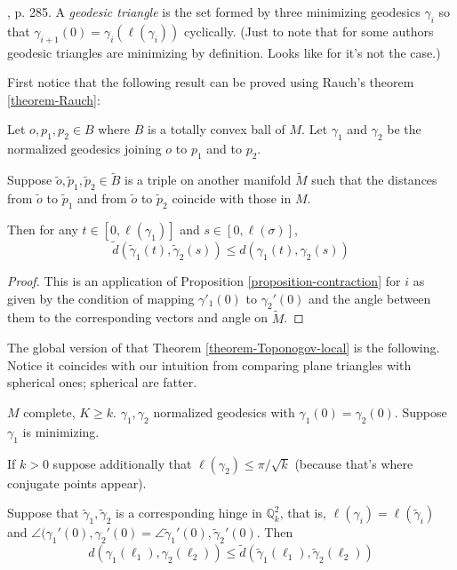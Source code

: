 \begin{definition}
\label{definition-geodesic-triangle}
\cite{doc}, p. 285. A {\it geodesic triangle} is the set formed by three
minimizing geodesics $\gamma_i$ so that
$\gamma_{i+1}(0)=\gamma_i(\ell(\gamma_i))$ cyclically. (Just to note that for
some authors geodesic triangles are minimizing by definition. Looks like for
\cite{meyers} it's not the case.)
\end{definition}

First notice that the following result can be proved using Rauch's theorem
\ref{theorem-Rauch}:

\begin{theorem}
\label{theorem-Toponogov-local}
Let $o,p_1,p_2 \in B$ where $B$ is a totally convex ball of $M$. Let $\gamma_1$
and $\gamma_2$ be the normalized geodesics joining $o$ to $p_1$ and to $p_2$.

Suppose $\tilde{o}, \tilde{p}_1,\tilde{p}_2 \in \tilde{B}$ is a triple on 
another manifold $\tilde{M}$ such that the distances from $\tilde{o}$ to
$\tilde{p}_1$ and from $\tilde{o}$ to $\tilde{p}_2$ coincide with those in $M$.

Then for any $t \in [0,\ell(\gamma_1)]$ and $s \in [0,\ell(\sigma)]$,
$$
\tilde{d}(\tilde{\gamma}_1(t),\tilde{\gamma}_2(s))\leq d(\gamma_1(t),\gamma_2(s))
$$
\end{theorem}

\begin{proof}
This is an application of Proposition \ref{proposition-contraction} for $i$ as
given by the condition of mapping $\gamma'_1(0)$ to $\gamma_2'(0)$ and the angle
between them to the corresponding vectors and angle on $\tilde{M}$.
\end{proof}

The global version of that Theorem \ref{theorem-Toponogov-local} is the
following. Notice it coincides with our intuition from comparing plane triangles
with spherical ones; spherical are fatter.

\begin{theorem}
\label{theorem-Toponogov-hinge}
$M$ complete, $K \geq k$. $\gamma_1,\gamma_2$ normalized geodesics with
$\gamma_1(0)=\gamma_2(0)$. Suppose $\gamma_1$ is minimizing.

If $k>0$ suppose additionally that $\ell(\gamma_2) \leq \pi/\sqrt{k}$ (because
that's where conjugate points appear).

Suppose that $\tilde{\gamma}_1,\tilde{\gamma}_2$ is a corresponding hinge in
$\mathbb{Q}_k^2$, that is, $\ell(\gamma_i)=\ell(\tilde{\gamma}_i)$ and
$\angle(\gamma_1'(0),\gamma_2'(0)=
\angle\tilde{\gamma}_1'(0),\tilde{\gamma}_2'(0)$. Then
\begin{equation}
\label{equation-Toponogov-hinge1}
d(\gamma_1(\ell_1),\gamma_2(\ell_2)) \leq 
\tilde{d}(\tilde{\gamma}_1(\ell_1),\tilde{\gamma}_2(\ell_2))
\end{equation}
\end{theorem}

